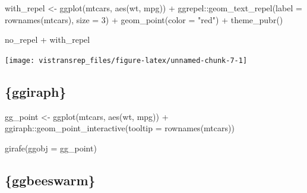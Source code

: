 \documentclass[]{book}
\newenvironment{Shaded}{}{}
\newcommand{\DataTypeTok}[1]{#1}
\newcommand{\DecValTok}[1]{#1}
\newcommand{\KeywordTok}[1]{\textcolor[rgb]{0.00,0.00,1.00}{#1}}
\newcommand{\NormalTok}[1]{#1}
\newcommand{\OperatorTok}[1]{#1}
\newcommand{\StringTok}[1]{\textcolor[rgb]{0.00,0.50,0.50}{#1}}
\begin{document}
\begin{Shaded}
\begin{Highlighting}[]
\NormalTok{with_repel <-}\StringTok{ }\KeywordTok{ggplot}\NormalTok{(mtcars, }\KeywordTok{aes}\NormalTok{(wt, mpg)) }\OperatorTok{+}
\StringTok{  }\NormalTok{ggrepel}\OperatorTok{::}\KeywordTok{geom_text_repel}\NormalTok{(}\DataTypeTok{label =} \KeywordTok{rownames}\NormalTok{(mtcars), }\DataTypeTok{size =} \DecValTok{3}\NormalTok{) }\OperatorTok{+}
\StringTok{  }\KeywordTok{geom_point}\NormalTok{(}\DataTypeTok{color =} \StringTok{"red"}\NormalTok{) }\OperatorTok{+}
\StringTok{  }\KeywordTok{theme_pubr}\NormalTok{()}
\end{Highlighting}
\end{Shaded}

\begin{Shaded}
\begin{Highlighting}[]
\NormalTok{no_repel }\OperatorTok{+}\StringTok{ }\NormalTok{with_repel}
\end{Highlighting}
\end{Shaded}

\begin{flushright}\texttt{[image: vistransrep\_files/figure-latex/unnamed-chunk-7-1]} \end{flushright}

\hypertarget{ggiraph}{%
\subsection{\{ggiraph\}}\label{ggiraph}}

\begin{Shaded}
\begin{Highlighting}[]
\NormalTok{gg_point <-}\StringTok{ }\KeywordTok{ggplot}\NormalTok{(mtcars, }\KeywordTok{aes}\NormalTok{(wt, mpg)) }\OperatorTok{+}
\StringTok{  }\NormalTok{ggiraph}\OperatorTok{::}\KeywordTok{geom_point_interactive}\NormalTok{(}\DataTypeTok{tooltip =} \KeywordTok{rownames}\NormalTok{(mtcars))}

\KeywordTok{girafe}\NormalTok{(}\DataTypeTok{ggobj =}\NormalTok{ gg_point)}
\end{Highlighting}
\end{Shaded}

\hypertarget{htmlwidget-63e63ac58891cc86e873}{}

\hypertarget{ggbeeswarm}{%
\subsection{\{ggbeeswarm\}}\label{ggbeeswarm}}
\end{document}
